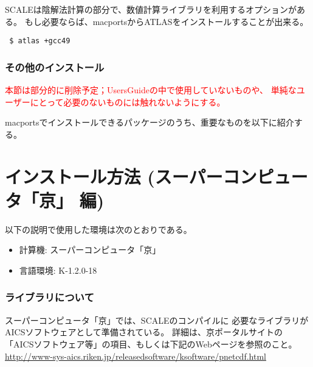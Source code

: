 SCALEは陰解法計算の部分で、数値計算ライブラリを利用するオプションがある。
もし必要ならば、macportsからATLASをインストールすることが出来る。
\begin{verbatim}
 $ atlas +gcc49
\end{verbatim}


\subsubsection{その他のインストール}

\textcolor{red}{\large 本節は部分的に削除予定；UsersGuideの中で使用していないものや、
単純なユーザーにとって必要のないものには触れないようにする。}

macportsでインストールできるパッケージのうち、重要なものを以下に紹介する。
%


\section{インストール方法 (スーパーコンピュータ「京」 編)}

以下の説明で使用した環境は次のとおりである。
\begin{itemize}
\item 計算機: スーパーコンピュータ「京」
\item 言語環境: K-1.2.0-18
\end{itemize}

\subsubsection{ライブラリについて}
スーパーコンピュータ「京」では、SCALEのコンパイルに
必要なライブラリがAICSソフトウェアとして準備されている。
詳細は、京ポータルサイトの「AICSソフトウェア等」の項目、もしくは下記のWebページを参照のこと。\\
\noindent \url{http://www-sys-aics.riken.jp/releasedsoftware/ksoftware/pnetcdf.html}

